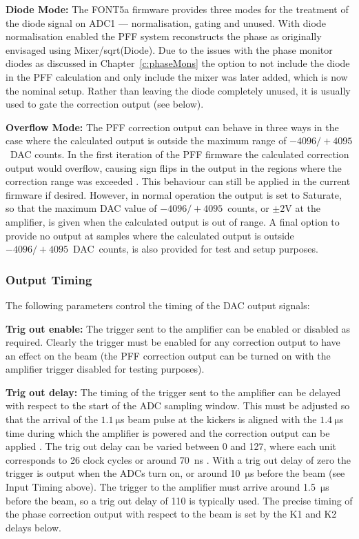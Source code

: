 \textbf{Diode Mode:} The FONT5a firmware provides three modes for the treatment of the diode signal on ADC1 --- normalisation, gating and unused. With diode normalisation enabled the PFF system reconstructs the phase as originally envisaged using Mixer/sqrt(Diode). Due to the issues with the phase monitor diodes as discussed in Chapter~\ref{c:phaseMons} the option to not include the diode in the PFF calculation and only include the mixer was later added, which is now the nominal setup. Rather than leaving the diode completely unused, it is usually used to gate the correction output (see below).

\textbf{Overflow Mode:} The PFF correction output can behave in three ways in the case where the calculated output is outside the maximum range of \(-4096/+4095\)~DAC counts. In the first iteration of the PFF firmware the calculated correction output would overflow, causing sign flips in the output in the regions where the correction range was exceeded \cite{glennPriv}. This behaviour can still be applied in the current firmware if desired. However, in normal operation the output is set to Saturate, so that the maximum DAC value of \(-4096/+4095\)~counts, or \(\pm2\)V at the amplifier, is given when the calculated output is out of range. A final option to provide no output at samples where the calculated output is outside \(-4096/+4095\)~DAC~counts, is also provided for test and setup purposes.

\subsubsection{Output Timing}

The following parameters control the timing of the DAC output signals:

\textbf{Trig out enable:} The trigger sent to the amplifier can be enabled or disabled as required. Clearly the trigger must be enabled for any correction output to have an effect on the beam (the PFF correction output can be turned on with the amplifier trigger disabled for testing purposes).

\textbf{Trig out delay:} The timing of the trigger sent to the amplifier can be delayed with respect to the start of the ADC sampling window. This must be adjusted so that the arrival of the \(1.1~\mathrm{\mu}\)s beam pulse at the kickers is aligned with the \(1.4~\mathrm{\mu}\)s time during which the amplifier is powered and the correction output can be applied \cite{colinPriv}. The trig out delay can be varied between 0 and 127, where each unit corresponds to 26 clock cycles or around 70~ns \cite{glennPriv}. With a trig out delay of zero the trigger is output when the ADCs turn on, or around 10~\(\mathrm{\mu}\)s before the beam (see Input Timing above). The trigger to the amplifier must arrive around 1.5~\(\mathrm{\mu}\)s before the beam, so a trig out delay of 110 is typically used. The precise timing of the phase correction output with respect to the beam is set by the K1 and K2 delays below.

